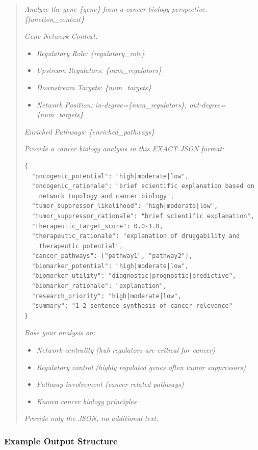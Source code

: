 \documentclass[11pt]{article}
\begin{document}
\begin{quote}
\textit{Analyze the gene \{gene\} from a cancer biology perspective. \{function\_context\}}

\textit{Gene Network Context:}
\begin{itemize}
\item \textit{Regulatory Role: \{regulatory\_role\}}
\item \textit{Upstream Regulators: \{num\_regulators\}}
\item \textit{Downstream Targets: \{num\_targets\}}
\item \textit{Network Position: in-degree=\{num\_regulators\}, out-degree=\{num\_targets\}}
\end{itemize}

\textit{Enriched Pathways: \{enriched\_pathways\}}

\textit{Provide a cancer biology analysis in this EXACT JSON format:}

\begin{verbatim}
{
  "oncogenic_potential": "high|moderate|low",
  "oncogenic_rationale": "brief scientific explanation based on
    network topology and cancer biology",
  "tumor_suppressor_likelihood": "high|moderate|low",
  "tumor_suppressor_rationale": "brief scientific explanation",
  "therapeutic_target_score": 0.0-1.0,
  "therapeutic_rationale": "explanation of druggability and
    therapeutic potential",
  "cancer_pathways": ["pathway1", "pathway2"],
  "biomarker_potential": "high|moderate|low",
  "biomarker_utility": "diagnostic|prognostic|predictive",
  "biomarker_rationale": "explanation",
  "research_priority": "high|moderate|low",
  "summary": "1-2 sentence synthesis of cancer relevance"
}
\end{verbatim}

\textit{Base your analysis on:}
\begin{itemize}
\item \textit{Network centrality (hub regulators are critical for cancer)}
\item \textit{Regulatory control (highly regulated genes often tumor suppressors)}
\item \textit{Pathway involvement (cancer-related pathways)}
\item \textit{Known cancer biology principles}
\end{itemize}

\textit{Provide only the JSON, no additional text.}
\end{quote}

\subsubsection{Example Output Structure}
\end{document}
